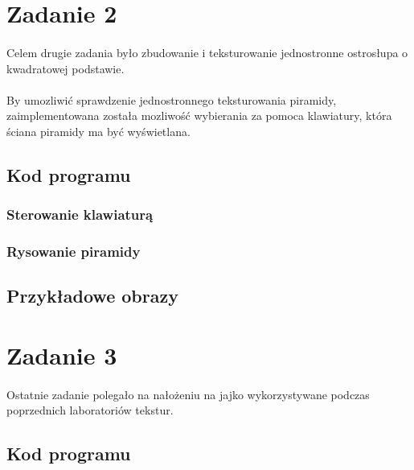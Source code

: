 \documentclass[wide,a4paper,titlepage,12pt] {article}
\begin{document}
\newpage
\section{Zadanie 2}
\paragraph{} %
Celem drugie zadania było zbudowanie i teksturowanie jednostronne ostrosłupa o kwadratowej podstawie.
\paragraph{}
By umozliwić sprawdzenie jednostronnego teksturowania piramidy, zaimplementowana została mozliwość wybierania za pomoca klawiatury, która ściana piramidy ma być wyświetlana.
\subsection{Kod programu}
\subsubsection{Sterowanie klawiaturą}
\subsubsection{Rysowanie piramidy}
\newpage
\subsection{Przykładowe obrazy}


\newpage
\section{Zadanie 3}
\paragraph{} 
Ostatnie zadanie polegało na nałożeniu na jajko wykorzystywane podczas poprzednich laboratoriów tekstur.
\subsection{Kod programu}
\newpage
\end{document}

